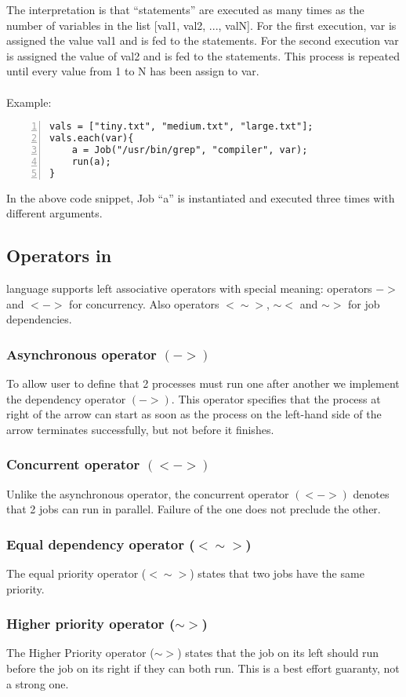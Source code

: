 The interpretation is that ``statements'' are executed as many times as the
number of variables in the list [val1, val2, ..., valN]. For the first
execution, var is assigned
the value val1 and is fed to the statements. For the second execution var is
assigned the value
of val2 and is fed to the statements. This process is repeated until every value 
from 1 to N has been assign to var.\\
\\
Example:
\begin{Verbatim}[numbers=left]
vals = ["tiny.txt", "medium.txt", "large.txt"];
vals.each(var){
    a = Job("/usr/bin/grep", "compiler", var);
    run(a);
}
\end{Verbatim}

In the above code snippet, Job ``a'' is instantiated and executed three times
with different arguments.


\subsection*{Operators in \lang{}}

\lang{} language supports left associative operators with special meaning: operators $->$ and $<->$ for concurrency.
Also operators $<\sim>$, $\sim<$ and $\sim>$ for job dependencies.
\subsubsection*{Asynchronous operator $(->)$}
To allow user to define that 2 processes must run one after another we implement the dependency operator $(->)$.
This operator specifies that the process at right of the arrow can start as soon as the process on the left-hand side of the arrow terminates successfully, but not before it finishes.
\subsubsection*{Concurrent operator $(<->)$}
Unlike the asynchronous operator, the concurrent operator $(<->)$ denotes that 2 jobs can
run in parallel. Failure of the one does not preclude the other.
\subsubsection*{Equal dependency operator ($<\sim>$)}
The equal priority operator ($<\sim>$) states that two jobs have the same priority.
\subsubsection*{Higher priority operator ($\sim>$)}
The Higher Priority operator ($\sim>$) states that the job on its left should run
before the job on its right if they can both run. This is a best effort guaranty, not a strong one.
